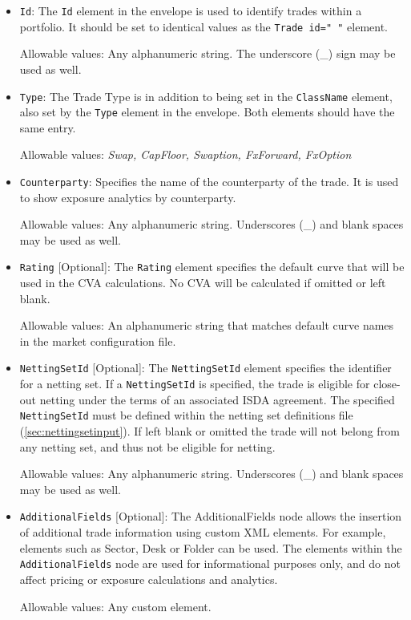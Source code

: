 \begin{itemize}
\item {\tt Id}: The {\tt Id} element in the envelope is used to identify trades within a portfolio. It should be set to identical values as the {\tt Trade id="   "} element.

Allowable values: Any alphanumeric string. The underscore (\_) sign may be used as well.

\item {\tt Type}: The Trade Type is in addition to being set in the {\tt ClassName} element, also set by the {\tt Type} element in the envelope. Both elements should have the same entry.

Allowable values: \emph{Swap, CapFloor, Swaption, FxForward, FxOption }

\item {\tt Counterparty}: Specifies the name of the counterparty of the trade.  It is used to show exposure analytics by counterparty. 

Allowable values: Any alphanumeric string. Underscores (\_) and blank spaces may be used as well. 

\item {\tt Rating} [Optional]: The {\tt Rating} element specifies the default curve that will be used in the CVA calculations.  No CVA will be calculated if omitted or left blank.
\vspace{1em}

Allowable values: An alphanumeric string that matches default curve names in the market configuration file.  

\item {\tt NettingSetId} [Optional]: The
  {\tt NettingSetId} element specifies the identifier for a
  netting set. If a \lstinline!NettingSetId! is specified, the trade
  is eligible for close-out netting under the terms of an associated
  ISDA agreement. The specified {\tt NettingSetId} must be
  defined within the netting set definitions file (\ref{sec:nettingsetinput}). If left blank or omitted the trade will not belong from any netting set, and thus not be eligible for netting.

Allowable values: Any alphanumeric string. Underscores (\_) and blank spaces may be used as well. 


\item \lstinline!AdditionalFields! [Optional]: The AdditionalFields node allows the insertion of additional trade information using custom XML elements.  For example, elements such as Sector, Desk or Folder can be used. The elements within the \lstinline!AdditionalFields! node are used for informational purposes only, and do not affect pricing or exposure calculations and analytics.

Allowable values: Any custom element.

\end{itemize}

